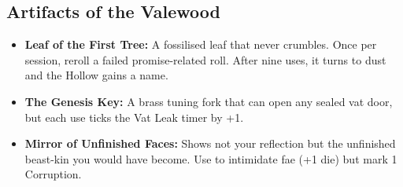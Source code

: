 \subsection*{Artifacts of the Valewood}
\begin{itemize}
\item \textbf{Leaf of the First Tree:} A fossilised leaf that never crumbles. Once per session, reroll a failed promise-related roll. After nine uses, it turns to dust and the Hollow gains a name.
\item \textbf{The Genesis Key:} A brass tuning fork that can open any sealed vat door, but each use ticks the Vat Leak timer by +1.
\item \textbf{Mirror of Unfinished Faces:} Shows not your reflection but the unfinished beast-kin you would have become. Use to intimidate fae (+1 die) but mark 1 Corruption.
\end{itemize}


